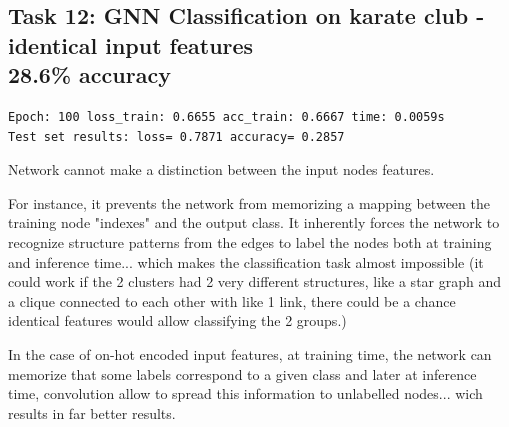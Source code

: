 \documentclass[a4paper]{article}
\begin{document}
\subsection*{Task 12: GNN Classification on karate club - identical input features \\ 28.6\% accuracy}
\begin{verbatim}
Epoch: 100 loss_train: 0.6655 acc_train: 0.6667 time: 0.0059s
Test set results: loss= 0.7871 accuracy= 0.2857
\end{verbatim}
    
Network cannot make a distinction between the input nodes features.

For instance, it prevents the network from memorizing a mapping between the training node "indexes" and the output class.
It inherently forces the network to recognize structure patterns from the edges to label the nodes both at training and inference time...
which makes the classification task almost impossible 
(it could work if the 2 clusters had 2 very different structures, like a star graph and a clique connected to each other with like 1 link,
there could be a chance identical features would allow classifying the 2 groups.)

In the case of on-hot encoded input features, at training time, the network can memorize that some labels correspond
to a given class and later at inference time, convolution allow to spread this information to unlabelled nodes...
wich results in far better results.


\end{document}
